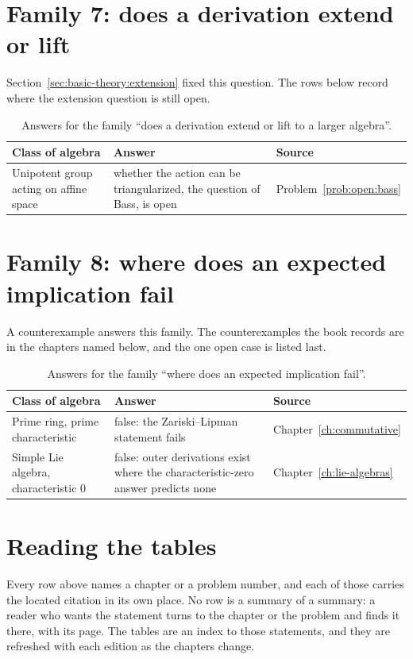 \section{Family 7: does a derivation extend or lift}

Section~\ref{sec:basic-theory:extension} fixed this question.
The rows below record where the extension question is still open.

\begin{table}[htbp]
  \centering
  \caption{Answers for the family ``does a derivation extend or lift to a
  larger algebra''.}
  \label{tab:q:extension}
  \begin{tabular}{p{}p{}p{}}
    \toprule
    Class of algebra & Answer & Source \\
    \midrule
    Unipotent group acting on affine space & whether the action can be
      triangularized, the question of Bass, is open &
      Problem~\ref{prob:open:bass} \\
    \bottomrule
  \end{tabular}
\end{table}

\section{Family 8: where does an expected implication fail}

A counterexample answers this family.
The counterexamples the book records are in the chapters named below, and the
one open case is listed last.

\begin{table}[htbp]
  \centering
  \caption{Answers for the family ``where does an expected implication
  fail''.}
  \label{tab:q:counterexamples}
  \begin{tabular}{p{}p{}p{}}
    \toprule
    Class of algebra & Answer & Source \\
    \midrule
    Prime ring, prime characteristic & false: the Zariski--Lipman
      statement fails & Chapter~\ref{ch:commutative} \\
    Simple Lie algebra, characteristic $0$ & false: outer derivations exist
      where the characteristic-zero answer predicts none &
      Chapter~\ref{ch:lie-algebras} \\
    \bottomrule
  \end{tabular}
\end{table}

\section{Reading the tables}

Every row above names a chapter or a problem number, and each of those carries
the located citation in its own place.
No row is a summary of a summary: a reader who wants the statement turns to the
chapter or the problem and finds it there, with its page.
The tables are an index to those statements, and they are refreshed with each
edition as the chapters change.
